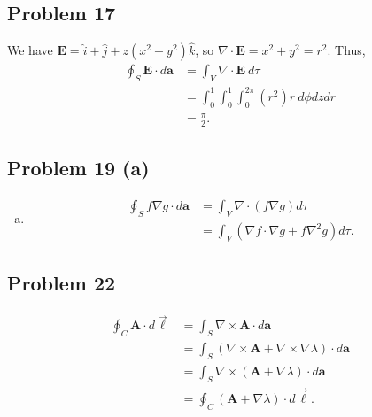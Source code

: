 \documentclass[10pt]{mypackage}
\begin{document}
\subsection{Problem 17}%
We have $\mathbf{E} = \hat{i} + \hat{j} + z\left(x^2 + y^2\right)\hat{k}$, so $\nabla \cdot \mathbf{E} = x^2 + y^2 = r^2$. Thus,
\begin{align*}
  \oint_{S}\mathbf{E}\cdot d\mathbf{a} &= \int_{V}\nabla \cdot \mathbf{E}\:d\tau\\
                                       &= \int_{0}^{1}\int_{0}^{1}\int_{0}^{2\pi}\left(r^2\right)r\:d\phi dz dr\\
                                       &= \frac{\pi}{2}.
\end{align*}
\subsection{Problem 19 (a)}%
\begin{enumerate}[(a)]
  \item 
    \begin{align*}
      \oint_{S}f\nabla g\cdot d\mathbf{a} &= \int_{V}\nabla \cdot \left(f\nabla g\right)d\tau\\
                                          &= \int_{V}\left(\nabla f\cdot \nabla g + f\nabla^2 g\right)d\tau.
    \end{align*}
\end{enumerate}
\subsection{Problem 22}%
\begin{align*}
  \oint_{C}\mathbf{A}\cdot d\vec{\ell} &= \int_{S}\nabla \times \mathbf{A}\cdot d\mathbf{a}\\
                                       &= \int_{S} \left(\nabla \times \mathbf{A} + \nabla \times \nabla \lambda\right)\cdot d\mathbf{a}\\
                                       &= \int_{S}\nabla \times \left(\mathbf{A}+ \nabla \lambda\right)\cdot d\mathbf{a}\\
                                       &= \oint_{C}\left(\mathbf{A} + \nabla \lambda\right)\cdot d\vec{\ell}.
\end{align*}
\end{document}
